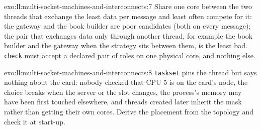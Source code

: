 \begin{solution}{exo:ll:multi-socket-machines-and-interconnects:7}
Share one core between the two threads that exchange the least data per message and least often compete for it: the
gateway and the book builder are poor candidates (both on every message); the pair that exchanges data only through
another thread, for example the book builder and the gateway when the strategy sits between them, is the least bad.
\texttt{check} must accept a declared pair of roles on one physical core, and nothing else.
\end{solution}

\begin{solution}{exo:ll:multi-socket-machines-and-interconnects:8}
\texttt{taskset} pins the thread but says nothing about the card: nobody checked that CPU 5 is on the card's node, the
choice breaks when the server or the slot changes, the process's memory may have been first touched elsewhere, and
threads created later inherit the mask rather than getting their own cores. Derive the placement from the topology and
check it at start-up.
\end{solution}

